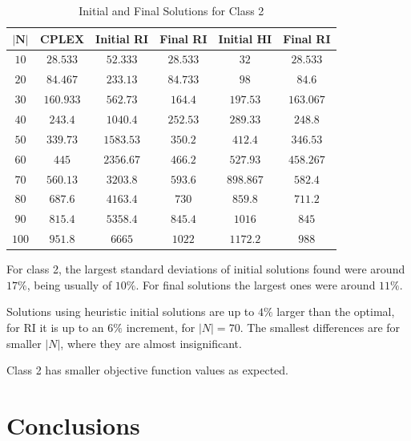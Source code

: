 \documentclass[a4paper,12pt]{article}
\begin{document}
	\begin{table}[H]
		\centering
		\begin{tabular}{c|c|c|c|c|c}
			$ \mathbf{|N|}$	& \textbf{CPLEX}& \textbf{Initial RI}   & \textbf{Final RI}	& \textbf{Initial HI} 	& \textbf{Final RI} \\ \hline
			$ 10  $			& $ 28.533 $ 	& $ 52.333 $ 			& $ 28.533 $  		& $ 32 $ 				& $ 28.533 $		\\ \hline
			$ 20  $			& $ 84.467 $ 	& $ 233.13 $ 			& $ 84.733 $  		& $ 98 $ 				& $ 84.6$			\\ \hline
			$ 30  $			& $ 160.933 $ 	& $ 562.73 $ 			& $ 164.4 $  		& $ 197.53 $ 			& $ 163.067 $ 		\\ \hline
			$ 40  $			& $ 243.4 $ 	& $ 1040.4 $ 			& $ 252.53 $  		& $ 289.33 $ 			& $ 248.8 $ 		\\ \hline
			$ 50  $			& $ 339.73 $ 	& $ 1583.53 $ 			& $ 350.2 $		  	& $ 412.4 $ 			& $ 346.53 $ 		\\ \hline
			$ 60  $			& $ 445 $ 		& $ 2356.67 $ 			& $ 466.2 $  		& $ 527.93 $ 			& $ 458.267 $	 	\\ \hline
			$ 70 $			& $ 560.13 $ 	& $ 3203.8 $ 			& $ 593.6 $  		& $ 898.867 $ 			& $ 582.4 $ 		\\ \hline
			$ 80 $			& $ 687.6 $ 	& $ 4163.4 $ 			& $ 730 $  			& $ 859.8 $ 			& $ 711.2 $ 		\\ \hline
			$ 90 $			& $ 815.4 $ 	& $ 5358.4 $ 			& $ 845.4 $  		& $ 1016 $ 				& $ 845 $ 			\\ \hline
			$ 100 $			& $ 951.8 $ 	& $ 6665 $ 				& $ 1022 $  		& $ 1172.2 $ 			& $ 988$ 			\\
		\end{tabular}
		\caption{Initial and Final Solutions for Class 2}
		\label{table:sols2}
	\end{table}
	For class 2,  the largest standard deviations of initial solutions found were around $17\%$, being usually of $10\%$.
	For final solutions the largest ones were around $11\%$.
	
	Solutions using heuristic initial solutions are up to $4\%$ larger than the optimal, for RI it is up to an $6\%$ increment, for $|N| = 70$.
	The smallest differences are for smaller $ |N| $, where they are almost insignificant.

	Class 2 has smaller objective function values as expected.
	
	\section{Conclusions}
	
\end{document}
